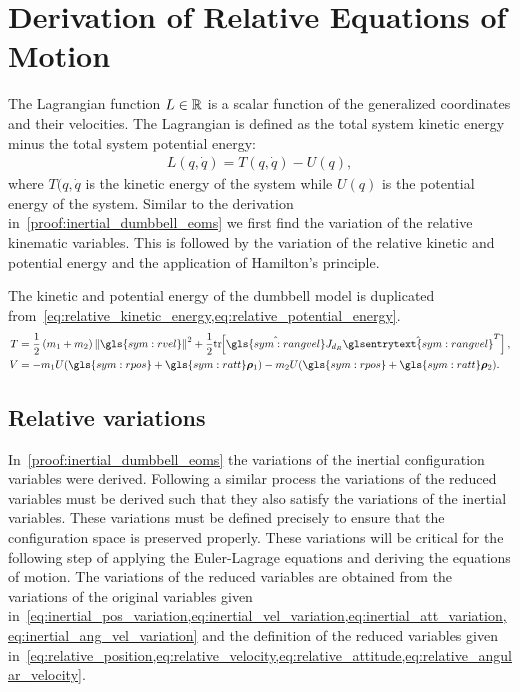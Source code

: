 
\chapter{Derivation of Relative Equations of Motion}\label{proof:relative_dumbbell_eoms}
The Lagrangian function \( L \in \mathbb{R} \) is a scalar function of the generalized coordinates and their velocities.
The Lagrangian is defined as the total system kinetic energy minus the total system potential energy:
\begin{align*}
    L(q, \dot{q} ) = T(q, \dot{q}) - U (q) ,
\end{align*}
where \( T(q, \dot{q} \) is the kinetic energy of the system while \( U(q) \) is the potential energy of the system.
Similar to the derivation in~\cref{proof:inertial_dumbbell_eoms} we first find  the variation of the relative kinematic variables.
This is followed by the variation of the relative kinetic and potential energy and the application of Hamilton's principle.

The kinetic and potential energy of the dumbbell model is duplicated from~\cref{eq:relative_kinetic_energy,eq:relative_potential_energy}.
\begin{align*}
    T &= \frac{1}{2} \parenth{m_1 + m_2} \norm{\gls{sym:rvel}}^2 + \frac{1}{2} \tr{\hat{\gls{sym:rangvel}} J_{d_R} \hat{\glsentrytext{sym:rangvel}}^T},\\
    V &= -m_1 U( \gls{sym:rpos} + \gls{sym:ratt} \vc{\rho}_1) - m_2 U(\gls{sym:rpos} + \gls{sym:ratt} \vc{\rho}_2).
\end{align*}

\section{Relative variations}\label{sec:relative_variations}
In~\cref{proof:inertial_dumbbell_eoms} the variations of the inertial configuration variables were derived.
Following a similar process the variations of the reduced variables must be derived such that they also satisfy the variations of the inertial variables.
These variations must be defined precisely to ensure that the configuration space is preserved properly. 
These variations will be critical for the following step of applying the Euler-Lagrage equations and deriving the equations of motion.
The variations of the reduced variables are obtained from the variations of the original variables given in~\cref{eq:inertial_pos_variation,eq:inertial_vel_variation,eq:inertial_att_variation,eq:inertial_ang_vel_variation} and the definition of the reduced variables given in~\cref{eq:relative_position,eq:relative_velocity,eq:relative_attitude,eq:relative_angular_velocity}.

